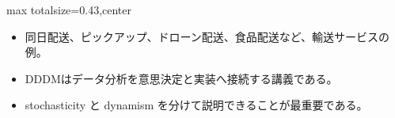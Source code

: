 \clearpage
{}
\begin{minipage}[t]{0.405\textwidth}
\begin{adjustbox}{max totalsize={\textwidth}{0.43\textheight},center}
\begin{minipage}{\textwidth}\scriptsize
{}\begin{itemize}
\item 同日配送、ピックアップ、ドローン配送、食品配送など、輸送サービスの例。
\end{itemize}\begin{itemize}
\item DDDMはデータ分析を意思決定と実装へ接続する講義である。
\item stochasticity と dynamism を分けて説明できることが最重要である。
\end{itemize}
\end{minipage}
\end{adjustbox}
\end{minipage}\hfill
